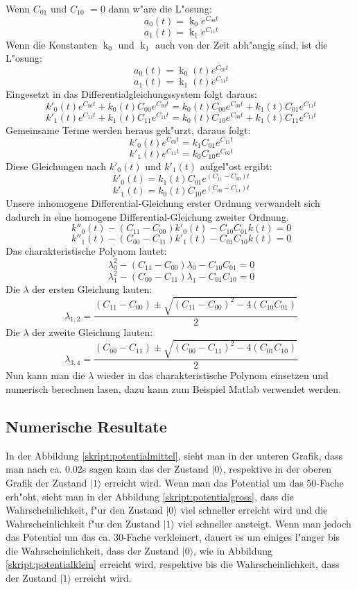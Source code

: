 \begin{refsection}
Wenn $ C_{01}$ und $ C_{10}$ $ =0$ dann w"are die L"osung:
\[
\ a_{0}(t) = \operatorname{k}_0 e^{C_{00} t} 
\]
\[
\ a_{1}(t) = \operatorname{k}_1 e^{C_{11} t}
\]
Wenn die Konstanten $ \operatorname{k}_0 $ und $ \operatorname{k}_1 $
auch von der Zeit abh"angig sind, ist die L"osung: 
\[
\ a_{0}(t) = \operatorname{k}_0(t) e^{C_{00} t} 
\]
\[
\ a_{1}(t) = \operatorname{k}_1(t) e^{C_{11} t} 
\]
Eingesetzt in das Differentialgleichungssystem folgt daraus:
\[
\ k'_{0}(t) e^{C_{00} t} + k_{0}(t) C_{00} e^{C_{00} t} = k_{0}(t) C_{00} e^{C_{00} t} + k_{1}(t)C_{01}e^{C_{11} t}
\]
\[
\ k'_{1}(t) e^{C_{11} t} + k_{1}(t) C_{11} e^{C_{11} t} = k_{0}(t) C_{10} e^{C_{00} t} + k_{1}(t)C_{11}e^{C_{11} t}
\]
Gemeinsame Terme werden heraus gek"urzt, daraus folgt:
\[
\ k'_{0}(t) e^{C_{00} t} = k_{1} C_{01} e^{C_{11} t}
\]
\[
\ k'_{1}(t) e^{C_{11} t} = k_{0} C_{10} e^{C_{00} t}
\]
Diese Gleichungen nach $ k'_{0}(t)$ und $ k'_{1}(t)$ aufgel"ost ergibt:
\[
\ k'_{0}(t) = k_{1}(t) C_{01} e^{(C_{11}-C_{00}) t}
\]
\[
\ k'_{1}(t) = k_{0}(t) C_{10} e^{(C_{00}-C_{11}) t}
\]
Unsere inhomogene Differential-Gleichung erster Ordnung verwandelt
sich dadurch in eine homogene Differential-Gleichung zweiter Ordnung.
\[ 
\ k''_{0}(t) - (C_{11}-C_{00}) k'_{0}(t) - C_{10}C_{01}k(t) = 0
\]
\[
\ k''_{1}(t) - (C_{00}-C_{11}) k'_{1}(t) - C_{01}C_{10}k(t) = 0
\]
Das charakteristische Polynom lautet:
\[
\ \lambda_{0}^{2} - (C_{11}-C_{00})\lambda_{0} - C_{10}C_{01} = 0
\]
\[
\ \lambda_{1}^{2} - (C_{00}-C_{11})\lambda_{1} - C_{01}C_{10} = 0
\]
Die $ \lambda $ der ersten Gleichung lauten:
\[
\ \lambda_{1,2} = \frac{(C_{11}-C_{00})\pm \sqrt{(C_{11}-C_{00})^2-4(C_{10}C_{01})}}{2}
\]
Die $ \lambda $ der zweite Gleichung lauten:
\[
\ \lambda_{3,4} = \frac{(C_{00}-C_{11})\pm \sqrt{(C_{00}-C_{11})^2-4(C_{01}C_{10})}}{2}
\]
Nun kann man die $\lambda$ wieder in das charakteristische Polynom
einsetzen und numerisch berechnen lasen, dazu kann zum Beispiel Matlab
verwendet werden.

\subsection{Numerische Resultate}
In der Abbildung \ref{skript:potentialmittel}, sieht man in der unteren
Grafik, dass man nach ca. 0.02s sagen kann das der Zustand $|0\rangle$, 
respektive in der oberen Grafik der Zustand $|1\rangle$ erreicht wird.
Wenn man das Potential um das 50-Fache erh"oht, sieht man in der Abbildung
\ref{skript:potentialgross}, dass die Wahrscheinlichkeit, f"ur  den Zustand
$|0\rangle$ viel schneller erreicht wird und die Wahrscheinlichkeit f"ur den
Zustand $|1\rangle$ viel schneller ansteigt.
Wenn man jedoch das Potential um das ca. 30-Fache verkleinert, dauert es
um einiges l"anger bis die Wahrscheinlichkeit, dass der Zustand $|0\rangle$,
wie in Abbildung \ref{skript:potentialklein} erreicht wird, respektive bis
die Wahrscheinlichkeit, dass der Zustand $|1\rangle$ erreicht wird.


\end{refsection}
